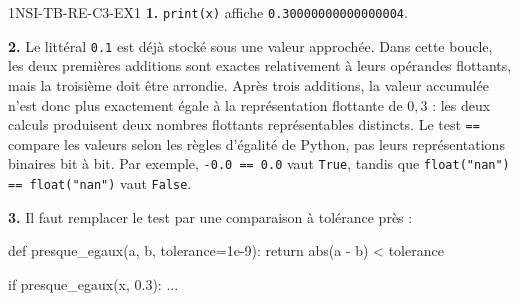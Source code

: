
\begin{corrige}{1NSI-TB-RE-C3-EX1}
\textbf{1.} \lstinline{print(x)} affiche \lstinline{0.30000000000000004}.

\textbf{2.} Le littéral \lstinline{0.1} est déjà stocké sous une valeur approchée. Dans cette
boucle, les deux premières additions sont exactes relativement à leurs opérandes flottants,
mais la troisième doit être arrondie. Après trois additions, la valeur accumulée n'est donc
plus exactement égale à la représentation flottante de $0{,}3$ : les deux calculs produisent
deux nombres flottants représentables distincts. Le test \lstinline{==} compare les valeurs
selon les règles d'égalité de Python, pas leurs représentations binaires bit à bit. Par
exemple, \lstinline{-0.0 == 0.0} vaut \lstinline{True}, tandis que
\lstinline{float("nan") == float("nan")} vaut \lstinline{False}.

\textbf{3.} Il faut remplacer le test par une comparaison à tolérance près :
\begin{python}
def presque_egaux(a, b, tolerance=1e-9):
    return abs(a - b) < tolerance

if presque_egaux(x, 0.3):
    ...
\end{python}
\end{corrige}

%
%
